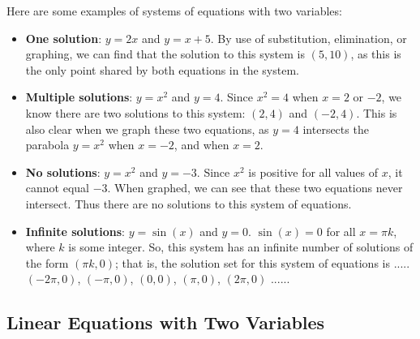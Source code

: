 Here are some examples of systems of equations with two variables:

\begin{itemize}
    \item \textbf{One solution}: $y = 2x$ and $y = x + 5$. By use of substitution, elimination, or graphing, we can find that the solution to this system is $(5, 10)$, as this is the only point shared by both equations in the system.
\end{itemize}

\begin{itemize}
    \item \textbf{Multiple solutions}: $y = x^2$ and $y = 4$. Since $x^2 = 4$ when $x = 2$ or $-2$, we know there are two solutions to this system: $(2, 4)$ and $(-2, 4)$. This is also clear when we graph these two equations, as $y = 4$ intersects the parabola $y = x^2$ when $x = -2$, and when $x = 2$.
\end{itemize}

\begin{itemize}
    \item \textbf{No solutions}: $y = x^2$ and $y = -3$. Since $x^2$ is positive for all values of $x$, it cannot equal $-3$. When graphed, we can see that these two equations never intersect. Thus there are no solutions to this system of equations.
\end{itemize}

\begin{itemize}
    \item \textbf{Infinite solutions}: $y = \sin(x)$ and $y = 0$. $\sin(x) = 0$ for all $x = \pi k$, where $k$ is some integer. So, this system has an infinite number of solutions of the form $(\pi k, 0)$; that is, the solution set for this system of equations is {..... $( -2\pi , 0 )$, $( -\pi , 0 )$, $( 0 , 0 )$, $( \pi , 0 )$, $( 2\pi , 0 )$ .....}.
\end{itemize}

\subsection{Linear Equations with Two Variables}
\label{sss:line-f2a6}

